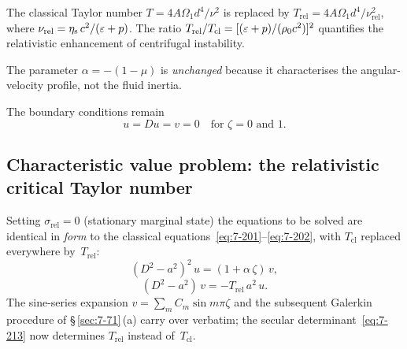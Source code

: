 \begin{relcorrection}
The classical Taylor number
$T = 4A\Omega_{1}d^{4}/\nu^{2}$
is replaced by
$T_{\mathrm{rel}} = 4A\Omega_{1}d^{4}/\nu_{\mathrm{rel}}^{2}$,
where $\nu_{\mathrm{rel}} = \eta_{\mathrm{s}}\,c^{2}/(\varepsilon+p)$.
The ratio $T_{\mathrm{rel}}/T_{\mathrm{cl}}
= [(\varepsilon+p)/(\rho_0 c^{2})]^{2}$ quantifies the
relativistic enhancement of centrifugal instability.
\end{relcorrection}

The parameter $\alpha = -(1-\mu)$ is \emph{unchanged} because it
characterises the angular-velocity profile, not the fluid inertia.

The boundary conditions remain
\begin{equation}
\label{eq:rel-7-201}
u = Du = v = 0
\quad\text{for } \zeta = 0 \text{ and } 1.
\end{equation}

\subsection{Characteristic value problem: the relativistic
critical Taylor number}\label{sec:rel-71-eigenvalue}

Setting $\sigma_{\mathrm{rel}} = 0$ (stationary marginal state)
the equations to be solved are identical in \emph{form} to the
classical equations~\eqref{eq:7-201}--\eqref{eq:7-202}, with
$T_{\mathrm{cl}}$ replaced everywhere by~$T_{\mathrm{rel}}$:
\begin{equation}
\label{eq:rel-7-202}
(D^{2}-a^{2})^{2}\,u = (1+\alpha\,\zeta)\,v,
\end{equation}
\begin{equation}
\label{eq:rel-7-203}
(D^{2}-a^{2})\,v = -T_{\mathrm{rel}}\,a^{2}\,u.
\end{equation}
The sine-series expansion $v = \sum_{m} C_{m}\sin m\pi\zeta$ and
the subsequent Galerkin procedure of \S\,\ref{sec:7-71}\,(a) carry
over verbatim; the secular determinant~\eqref{eq:7-213} now
determines $T_{\mathrm{rel}}$ instead of~$T_{\mathrm{cl}}$.

